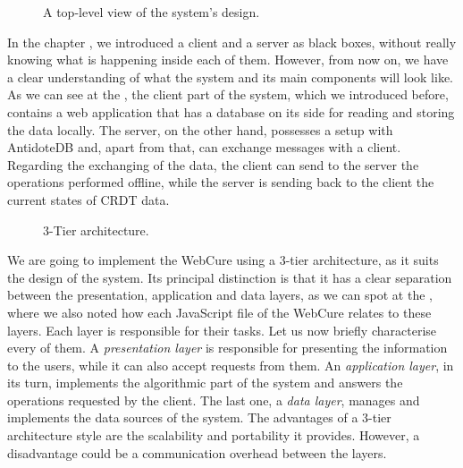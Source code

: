 \begin{figure}[!htb]
    \begin{center}
        \setlength{\fboxsep}{15pt}%
        \setlength{\fboxrule}{1pt}%
    \def\svgwidth{\linewidth}
    \fbox{}
    \caption {A top-level view of the system's design.}
    \label{fig:impl1}
\end{center}
\end{figure}

In the chapter , we introduced a client and a server as black boxes, without really knowing what is happening inside each of them. However, from now on, we have a clear understanding of what the system and its main components will look like. As we can see at the , the client part of the system, which we introduced before, contains a web application that has a database on its side for reading and storing the data locally. The server, on the other hand, possesses a setup with AntidoteDB and, apart from that, can exchange messages with a client. Regarding the exchanging of the data, the client can send to the server the operations performed offline, while the server is sending back to the client the current states of CRDT data.

\begin{figure}[!htb]
    \begin{center}
    \def\svgwidth{\linewidth}
    
    \caption {3-Tier architecture.}
    \label{fig:dev1}
\end{center}
\end{figure}

We are going to implement the WebCure using a 3-tier architecture\cite{51}, as it suits the design of the system. Its principal distinction is that it has a clear separation between the presentation, application and data layers, as we can spot at the , where we also noted how each JavaScript file of the WebCure relates to these layers. Each layer is responsible for their tasks. Let us now briefly characterise every of them. A \textit{presentation layer} is responsible for presenting the information to the users, while it can also accept requests from them. An \textit{application layer}, in its turn, implements the algorithmic part of the system and answers the operations requested by the client. The last one, a \textit{data layer}, manages and implements the data sources of the system. The advantages of a 3-tier architecture style are the scalability and portability it provides. However, a disadvantage could be a communication overhead between the layers\cite{50}.

